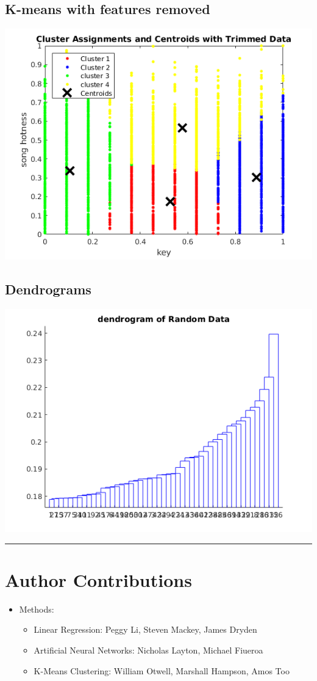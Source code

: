 \documentclass[12pt]{article}
\newcommand{\horizontalLine}{
	\begin{center}
		\hrule width 1.0\textwidth
	\end{center}
}
\begin{document}
\subsection{K-means with features removed}
\label{subsec:trimmedKmeans}
\includegraphics[scale=0.6]{images/clustering/trimmedkMeans}
\subsection{Dendrograms}
\label{subsec:dendrograms}
\includegraphics[scale=0.6]{images/clustering/h_random}
\horizontalLine
\section{Author Contributions}
\label{sec:authorContributions}
\begin{itemize}
    \item Methods:
    \begin{itemize}
        \item Linear Regression: Peggy Li, Steven Mackey, James Dryden
        \item Artificial Neural Networks: Nicholas Layton, Michael Fiueroa
        \item K-Means Clustering: William Otwell, Marshall Hampson, Amos Too
    \end{itemize}
\end{itemize}
\end{document}
